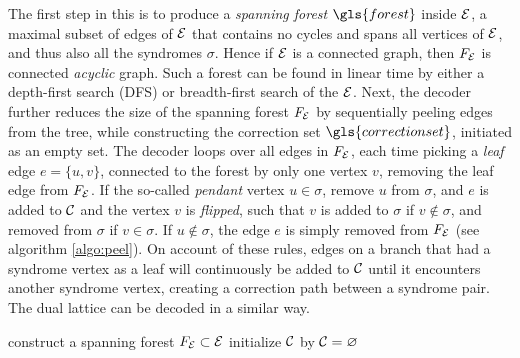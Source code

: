 The first step in this is to produce a \emph{spanning forest} $\gls{forest}$ inside $\mathcal{E}$, a maximal subset of edges of $\mathcal{E}$ that contains no cycles and spans all vertices of $\mathcal{E}$, and thus also all the syndromes $\sigma$. Hence if $\mathcal{E}$ is a connected graph, then $F_{\mathcal{E}}$ is connected \emph{acyclic} graph. Such a forest can be found in linear time by either a depth-first search (DFS) or breadth-first search of the $\mathcal{E}$. Next, the decoder further reduces the size of the spanning forest $F_{\mathcal{E}}$ by sequentially peeling edges from the tree, while constructing the correction set $\gls{correctionset}$, initiated as an empty set. The decoder loops over all edges in $F_{\mathcal{E}}$, each time picking a \emph{leaf} edge $e = \{u,v\}$, connected to the forest by only one vertex $v$, removing the leaf edge from $F_{\mathcal{E}}$. If the so-called \emph{pendant} vertex $u\in\sigma$, remove $u$ from $\sigma$, and $e$ is added to $\mathcal{C}$ and the vertex $v$ is \emph{flipped}, such that $v$ is added to $\sigma$ if $v \notin \sigma$, and removed from $\sigma$ if $v\in\sigma$.  If $u\notin\sigma$, the edge $e$ is simply removed from $F_{\mathcal{E}}$ (see algorithm \ref{algo:peel}). On account of these rules, edges on a branch that had a syndrome vertex as a leaf will continuously be added to $\mathcal{C}$ until it encounters another syndrome vertex, creating a correction path between a syndrome pair. The dual lattice can be decoded in a similar way.
\begin{algo}[algotitle=Peeling decoder (adapted from \cite{delfosse2017linear}), label=algo:peel]
  \begin{algorithm}[H]
    \BlankLine
    construct a spanning forest $F_{\mathcal{E}} \subset\mathcal{E}$\;
    initialize $\mathcal{C}$ by $\mathcal{C} = {\varnothing}$\;
  \end{algorithm}
\end{algo}

